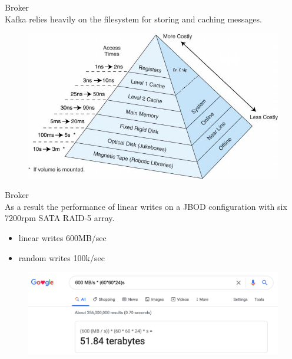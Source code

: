 \begin{frame}[plain,t]{Broker} %
     \\
    \vspace{2ex}
    Kafka relies heavily on the filesystem for storing and caching messages. 
    
    \begin{figure}
        \centering
        \includegraphics[width=0.8\linewidth]{image/0212}
        \label{fig:0212}
    \end{figure}
    
    
    
\end{frame}
\begin{frame}[plain,t]{Broker} %
     \\
    \vspace{2ex}
      As a result the performance of linear writes on a JBOD configuration with six 7200rpm SATA RAID-5 array.
      \begin{itemize}
          \item linear writes 600MB/sec 
          \item random writes 100k/sec
      \end{itemize}
      
      
    
    \vspace{2ex}
    \begin{figure}
        \centering
        \includegraphics[width=0.9\linewidth]{image/0213}
        \label{fig:0213}
    \end{figure}
    
    
\end{frame}
